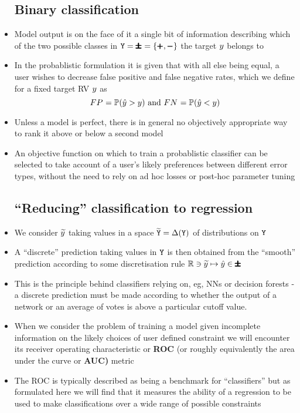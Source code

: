 \documentclass{article}
\begin{document}
\begin{itemize}
\subsection{Binary classification}
  \item
    Model output is on the face of it a single bit of information describing which of the two possible classes in $\OUT=\TWO=\{\POS,\NEG\}$ the target $\Targ$ belongs to
    \item
      In the probablistic formulation it is given that with all else being equal, a user wishes to decrease false positive and false negative rates, which we define for a fixed target RV $\Targ$ as
      $$
      \FP=\Prob(\Pred>\Targ)\text{ and }\FN=\Prob(\Pred<\Targ)
      $$
    \item
      Unless a model is perfect, there is in general no objectively appropriate way to rank it above or below a second model
    \item
      An objective function on which to train a probablistic classifier can be selected to take account of a user's likely preferences between different error types, without the need to rely on ad hoc losses or post-hoc parameter tuning
    \subsection{``Reducing'' classification to regression}
    \item We consider $\widetilde{y}$ taking values in a space $\OUTPR=\Probs(\OUT)$ of distributions on $\OUT$
    \item
      A ``discrete'' prediction taking values in $\OUT$ is then obtained from the ``smooth'' prediction according to some discretisation rule $\mathbb R\ni\widetilde{y}\mapsto{\hat{y}}\in\pmb{\pmb\pm}$
    \item
      This is the principle behind classifiers relying on, eg, NNs or decision forests - a discrete prediction must be made according to whether the output of a network or an average of votes is above a particular cutoff value.
    \item
      When we consider the problem of training a model given incomplete information on the likely choices of user defined constraint we will encounter its receiver operating characteristic or \textbf{ROC} (or roughly equivalently the area under the curve or \textbf{AUC)} metric
    \item
      The ROC is typically described as being a benchmark for ``classifiers'' but as formulated here we will find that it measures the ability of a regression to be used to make classifications over a wide range of possible constraints

\end{itemize}
\end{document}
